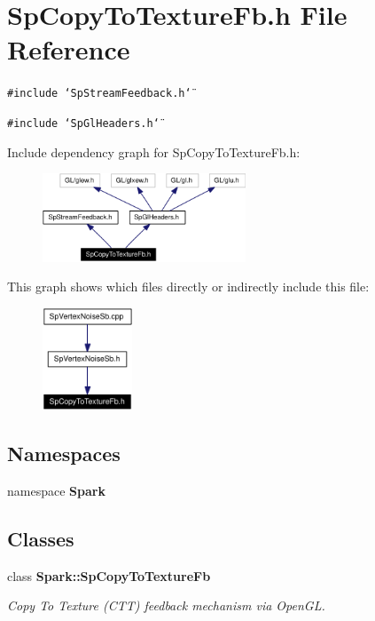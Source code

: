 \section{Sp\-Copy\-To\-Texture\-Fb.h File Reference}
\label{SpCopyToTextureFb_8h}
{\tt \#include \char`\"{}Sp\-Stream\-Feedback.h\char`\"{}}\par
{\tt \#include \char`\"{}Sp\-Gl\-Headers.h\char`\"{}}\par


Include dependency graph for Sp\-Copy\-To\-Texture\-Fb.h:\begin{figure}[H]
\begin{center}
\leavevmode
\includegraphics[width=172pt]{SpCopyToTextureFb_8h__incl}
\end{center}
\end{figure}


This graph shows which files directly or indirectly include this file:\begin{figure}[H]
\begin{center}
\leavevmode
\includegraphics[width=76pt]{SpCopyToTextureFb_8h__dep__incl}
\end{center}
\end{figure}
\subsection*{Namespaces}
\begin{CompactItemize}
\item 
namespace {\bf Spark}
\end{CompactItemize}
\subsection*{Classes}
\begin{CompactItemize}
\item 
class {\bf Spark::Sp\-Copy\-To\-Texture\-Fb}
\begin{CompactList}\small\item\em Copy To Texture (CTT) feedback mechanism via Open\-GL. \item\end{CompactList}\end{CompactItemize}
